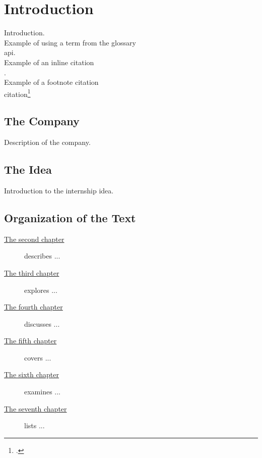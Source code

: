 \chapter{Introduction}
\label{chap:introduction}

Introduction.\\

\noindent Example of using a term from the glossary \\ 
\gls{api}. \\

\noindent Example of an inline citation \\ 
\cite{site:agile-manifesto}. \\

\noindent Example of a footnote citation \\ 
citation\footcite{womak:lean-thinking} \\

\section{The Company}

Description of the company.

\section{The Idea}

Introduction to the internship idea.

\section{Organization of the Text}

\begin{description}
    \item[{\hyperref[chap:literature-review]{The second chapter}}] describes ...
    
    \item[{\hyperref[chap:gap-analysis]{The third chapter}}] explores ...
    
    \item[{\hyperref[chap:system-analysis-and-design]{The fourth chapter}}] discusses ...
    
    \item[{\hyperref[chap:Methodology]{The fifth chapter}}] covers ...
    
    \item[{\hyperref[chap:conclusion]{The sixth chapter}}] examines ...
    
    \item[{\hyperref[chap:references]{The seventh chapter}}] lists ...
    
\end{description}

